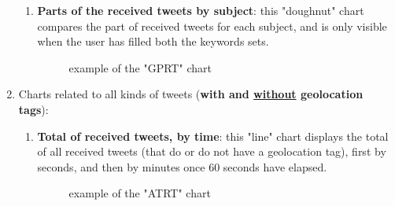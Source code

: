 \documentclass[a4paper,11pt]{report}
\begin{document}
\begin{enumerate}
\begin{enumerate}
		\item \textbf{Parts of the received tweets by subject}: this "doughnut" chart compares the part of received tweets for each subject, and is only visible when the user has filled both the keywords sets.
		\begin{figure}[H]
		\vspace{-5pt}
		\begin{center}
		\vspace{-5pt}
		\caption{example of the "GPRT" chart}
		\end{center}
		\end{figure}
		\vspace{-10pt}
	\end{enumerate}

	\item Charts related to all kinds of tweets (\textbf{with and \underline{without} geolocation tags}):
	 \begin{enumerate}
	 	\item \textbf{Total of received tweets, by time}: this "line" chart displays the total of all received tweets (that do or do not have a geolocation tag), first by seconds, and then by minutes once 60 seconds have elapsed.
	 	\begin{figure}[H]
		\vspace{-5pt}
		\begin{center}
		\vspace{-5pt}
		\caption{example of the "ATRT" chart}
		\end{center}
		\end{figure}
		\vspace{-10pt}
		\newpage


\end{enumerate}
\end{enumerate}
\end{document}
